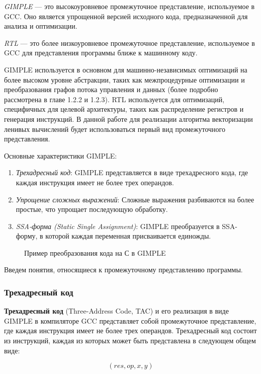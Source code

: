 \textit{GIMPLE} — это высокоуровневое промежуточное представление, используемое в GCC. Оно является упрощенной версией исходного кода, предназначенной для анализа и оптимизации. 

\textit{RTL} — это более низкоуровневое промежуточное представление, используемое в GCC для представления программы ближе к машинному коду.

GIMPLE используется в основном для машинно-независимых оптимизаций на более высоком уровне абстракции, таких как межпроцедурные оптимизации и преобразования графов потока управления и данных (более подробно рассмотрена в главе 1.2.2 и 1.2.3). RTL используется для оптимизаций, специфичных для целевой архитектуры, таких как распределение регистров и генерация инструкций. В данной работе для реализации алгоритма векторизации ленивых вычислений будет использоваться первый вид промежуточного представления.

Основные характеристики GIMPLE:
\begin{enumerate}
    \item \textit{Трехадресный код}: GIMPLE представляется в виде трехадресного кода, где каждая инструкция имеет не более трех операндов.
    \item \textit{Упрощение сложных выражений}: Сложные выражения разбиваются на более простые, что упрощает последующую обработку.
    \item \textit{SSA-форма (Static Single Assignment)}: GIMPLE преобразуется в SSA-форму, в которой каждая переменная присваивается единожды.
\end{enumerate}

\begin{figure}[!htb]
    \centering
    
    \caption{Пример преобразования кода на С в GIMPLE}
\end{figure}

Введем понятия, относящиеся к промежуточному представлению программы. 

\subsubsection{Трехадресный код}
\textbf{Трехадресный код} (Three-Address Code, TAC) и его реализация в виде GIMPLE в компиляторе GCC представляет собой промежуточное представление, где каждая инструкция имеет не более трех операндов. Трехадресный код состоит из инструкций, каждая из которых может быть представлена в следующем общем виде:

\begin{equation}
    (res, op, x, y)
\end{equation}

